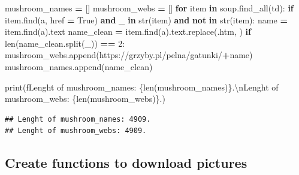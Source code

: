 \documentclass[
]{article}
\newenvironment{Shaded}{\begin{snugshade}}{\end{snugshade}}
\newcommand{\BuiltInTok}[1]{#1}
\newcommand{\CharTok}[1]{\textcolor[rgb]{0.31,0.60,0.02}{#1}}
\newcommand{\ControlFlowTok}[1]{\textcolor[rgb]{0.13,0.29,0.53}{\textbf{#1}}}
\newcommand{\DecValTok}[1]{\textcolor[rgb]{0.00,0.00,0.81}{#1}}
\newcommand{\KeywordTok}[1]{\textcolor[rgb]{0.13,0.29,0.53}{\textbf{#1}}}
\newcommand{\NormalTok}[1]{#1}
\newcommand{\OperatorTok}[1]{\textcolor[rgb]{0.81,0.36,0.00}{\textbf{#1}}}
\newcommand{\SpecialCharTok}[1]{\textcolor[rgb]{0.00,0.00,0.00}{#1}}
\newcommand{\SpecialStringTok}[1]{\textcolor[rgb]{0.31,0.60,0.02}{#1}}
\newcommand{\StringTok}[1]{\textcolor[rgb]{0.31,0.60,0.02}{#1}}
\newcommand{\VariableTok}[1]{\textcolor[rgb]{0.00,0.00,0.00}{#1}}
\begin{document}
\begin{Shaded}
\begin{Highlighting}[]
\NormalTok{mushroom\_names }\OperatorTok{=}\NormalTok{ []}
\NormalTok{mushroom\_webs }\OperatorTok{=}\NormalTok{ []}
\ControlFlowTok{for}\NormalTok{ item }\KeywordTok{in}\NormalTok{ soup.find\_all(}\StringTok{\textquotesingle{}td\textquotesingle{}}\NormalTok{):}
    \ControlFlowTok{if}\NormalTok{ item.find(}\StringTok{\textquotesingle{}a\textquotesingle{}}\NormalTok{, href }\OperatorTok{=} \VariableTok{True}\NormalTok{) }\KeywordTok{and} \StringTok{\textquotesingle{}\_\textquotesingle{}} \KeywordTok{in} \BuiltInTok{str}\NormalTok{(item) }\KeywordTok{and} \StringTok{\textquotesingle{}{-}\textquotesingle{}} \KeywordTok{not} \KeywordTok{in} \BuiltInTok{str}\NormalTok{(item):}
\NormalTok{        name }\OperatorTok{=}\NormalTok{ item.find(}\StringTok{\textquotesingle{}a\textquotesingle{}}\NormalTok{).text}
\NormalTok{        name\_clean }\OperatorTok{=}\NormalTok{ item.find(}\StringTok{\textquotesingle{}a\textquotesingle{}}\NormalTok{).text.replace(}\StringTok{\textquotesingle{}.htm\textquotesingle{}}\NormalTok{, }\StringTok{\textquotesingle{}\textquotesingle{}}\NormalTok{)}
        \ControlFlowTok{if} \BuiltInTok{len}\NormalTok{(name\_clean.split(}\StringTok{\textquotesingle{}\_\textquotesingle{}}\NormalTok{)) }\OperatorTok{==} \DecValTok{2}\NormalTok{:}
\NormalTok{            mushroom\_webs.append(}\StringTok{\textquotesingle{}https://grzyby.pl/pelna/gatunki/\textquotesingle{}}\OperatorTok{+}\NormalTok{name)}
\NormalTok{            mushroom\_names.append(name\_clean)}

\BuiltInTok{print}\NormalTok{(}\SpecialStringTok{f\textquotesingle{}Lenght of mushroom\_names: }\SpecialCharTok{\{}\BuiltInTok{len}\NormalTok{(mushroom\_names)}\SpecialCharTok{\}}\SpecialStringTok{.}\CharTok{\textbackslash{}n}\SpecialStringTok{Lenght of mushroom\_webs: }\SpecialCharTok{\{}\BuiltInTok{len}\NormalTok{(mushroom\_webs)}\SpecialCharTok{\}}\SpecialStringTok{.\textquotesingle{}}\NormalTok{)}
\end{Highlighting}
\end{Shaded}

\begin{verbatim}
## Lenght of mushroom_names: 4909.
## Lenght of mushroom_webs: 4909.
\end{verbatim}

\hypertarget{create-functions-to-download-pictures}{%
\subsection{Create functions to download
pictures}\label{create-functions-to-download-pictures}}
\end{document}
